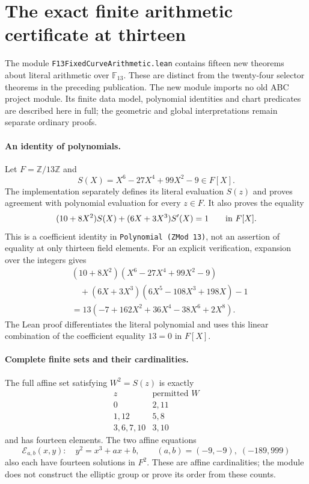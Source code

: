 \section{The exact finite arithmetic certificate at thirteen}
\label{sec-f13ds-formal-scope}

The module
\texttt{F13Fixed\allowbreak{}Curve\allowbreak{}Arithmetic.lean}
contains fifteen new theorems about literal arithmetic over
$\mathbb F_{13}$. These are distinct from the twenty-four selector
theorems in the preceding publication. The new module imports no old
ABC project module. Its finite data model, polynomial identities and
chart predicates are described here in full; the geometric and
global interpretations remain separate ordinary proofs.

\paragraph{An identity of polynomials.}
Let $F=\mathbb Z/13\mathbb Z$ and
\[
 S(X)=X^6-27X^4+99X^2-9\in F[X].
\]
The implementation separately defines its literal evaluation $S(z)$
and proves agreement with polynomial evaluation for every $z\in F$.
It also proves the equality
\begin{equation}
 (10+8X^2)S(X)+(6X+3X^3)S'(X)=1
 \qquad\hbox{in }F[X].
 \label{eq-f13ds-bezout}
\end{equation}
This is a coefficient identity in
\texttt{Polynomial (ZMod 13)}, not an assertion of equality at only
thirteen field elements. For an explicit verification, expansion
over the integers gives
\[
 \begin{split}
 &(10+8X^2)(X^6-27X^4+99X^2-9)\\
 &\quad +(6X+3X^3)(6X^5-108X^3+198X)-1\\
 &=13(-7+162X^2+36X^4-38X^6+2X^8).
 \end{split}
\]
The Lean proof differentiates the literal polynomial and uses this
linear combination of the coefficient equality $13=0$ in $F[X]$.

\paragraph{Complete finite sets and their cardinalities.}
The full affine set satisfying $W^2=S(z)$ is exactly
\[
 \begin{array}{c|c}
 z&\text{permitted }W\\ \hline
 0&2,11\\
 1,12&5,8\\
 3,6,7,10&3,10
 \end{array}
\]
and has fourteen elements. The two affine equations
\[
 \mathcal E_{a,b}(x,y):\quad y^2=x^3+ax+b,
 \qquad (a,b)=(-9,-9),\;(-189,999)
\]
also each have fourteen solutions in $F^2$.
These are affine cardinalities; the module does not construct the
elliptic group or prove its order from these counts.

